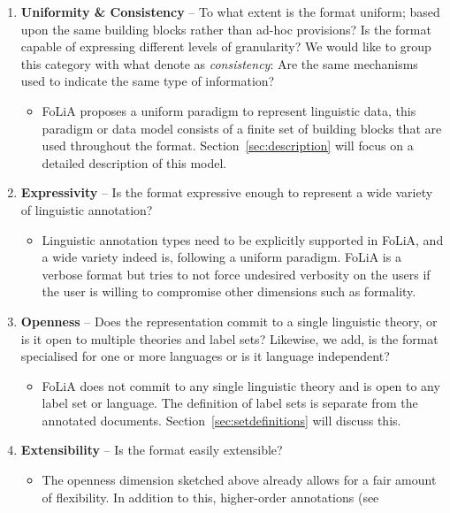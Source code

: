 \documentclass[a4paper,10pt,twoside]{article}
\begin{document}
\begin{enumerate}
\item \textbf{Uniformity \& Consistency} -- To what extent is the format
  uniform; based upon the same building blocks rather than ad-hoc provisions?
  Is the format capable of expressing different levels of granularity? We would
  like to group this category with what  denote as
  \emph{consistency}: Are the same mechanisms used to indicate the same type of
  information?
  \begin{itemize}
    \item[] FoLiA proposes a uniform paradigm to represent linguistic data, this
      paradigm or data model consists of a finite set of building blocks that
      are used throughout the format. Section~\ref{sec:description} will focus
      on a detailed description of this model.
  \end{itemize}
\item \textbf{Expressivity} -- Is the format expressive enough to represent a
  wide variety of linguistic annotation?
  \begin{itemize}
    \item[] Linguistic annotation types need to be explicitly supported in FoLiA,
      and a wide variety indeed is, following a uniform paradigm. FoLiA is a
      verbose format but tries to not force undesired verbosity on the users
      if the user is willing to compromise other dimensions such as formality.
  \end{itemize}
\item \textbf{Openness} -- Does the representation commit to a single linguistic
  theory, or is it open to multiple theories and label sets? Likewise, we add,
  is the format specialised for one or more languages or is it language
  independent?
  \begin{itemize}
    \item[] FoLiA does not commit to any single linguistic theory and is open to
      any label set or language. The definition of label sets is separate from
      the annotated documents. Section~\ref{sec:setdefinitions} will discuss
      this.
  \end{itemize}
\item \textbf{Extensibility} -- Is the format easily extensible?
  \begin{itemize}
    \item[] The openness dimension sketched above already allows for a fair
      amount of flexibility. In addition to this, higher-order annotations (see

\end{itemize}
\end{enumerate}
\end{document}
